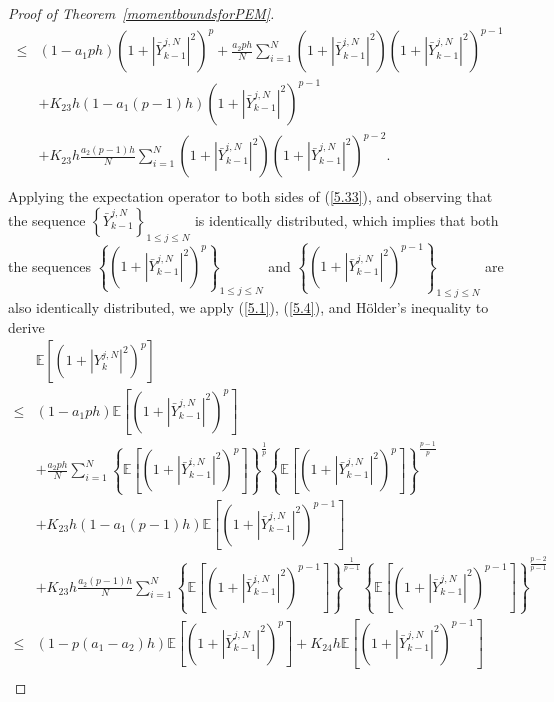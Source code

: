 \documentclass[12pt]{article}
\numberwithin{equation}{section}
\begin{document}
\begin{proof}[Proof of Theorem~\ref{momentboundsforPEM}]
\begin{equation}
\begin{aligned}
	\leq&\left( 1-a_1ph \right)  \left( 1+\left| \bar{Y}_{k-1}^{j,N} \right|^2 \right) ^p+\tfrac{a_2ph}{N}\sum_{i=1}^N{ \left( 1+\left| \bar{Y}_{k-1}^{i,N} \right|^2 \right) \left( 1+\left| \bar{Y}_{k-1}^{j,N} \right|^2 \right) ^{p-1}}\\
&+  K_{23}h\left(1-a_{1}\left(p-1\right)h\right) \left( 1+\left| \bar{Y}_{k-1}^{j,N} \right|^2 \right) ^{p-1}\\
&+K_{23}h\tfrac{a_2\left(p-1\right)h}{N}\sum_{i=1}^N{ \left( 1+\left| \bar{Y}_{k-1}^{i,N} \right|^2 \right) \left( 1+\left| \bar{Y}_{k-1}^{j,N} \right|^2 \right) ^{p-2}} .\\
\end{aligned}
\end{equation}
Applying the expectation operator to both sides of (\ref{5.33}), and observing that the sequence $\left\{ \bar{Y}_{k-1}^{j,N} \right\} _{1\leqslant j\leqslant N}$ is identically distributed, which implies that both the sequences $\left\{ \left( 1+\left| \bar{Y}_{k-1}^{j,N} \right|^2 \right)^p\right\} _{1\leqslant j\leqslant N}$ and $\left\{ \left( 1+\left| \bar{Y}_{k-1}^{j,N} \right|^2 \right)^{p-1}\right\} _{1\leqslant j\leqslant N}$ are also identically distributed, we apply (\ref{5.1}), (\ref{5.4}), and H\"{o}lder's inequality to  derive 
\begin{equation}\tag{5.81}\label{5.34}
\begin{aligned}
&\mathbb{E}\left[\left(1+\left|Y^{j,N}_k\right|^2\right)^p  \right]\\
\le& \left( 1-a_1ph \right) \mathbb{E} \left[ \left( 1+\left| \bar{Y}_{k-1}^{j,N} \right|^2 \right) ^p \right] 
\\
&+\tfrac{a_2ph}{N}\sum_{i=1}^N{\left\{ \mathbb{E} \left[ \left( 1+\left| \bar{Y}_{k-1}^{i,N} \right|^2 \right) ^p \right] \right\} ^{\frac{1}{p}}\left\{ \mathbb{E} \left[ \left( 1+\left| \bar{Y}_{k-1}^{j,N} \right|^2 \right) ^p \right] \right\} ^{\frac{p-1}{p}}}
\\
&+K_{23}h\left(1-a_{1}\left(p-1\right)h\right) \mathbb{E} \left[ \left( 1+\left| \bar{Y}_{k-1}^{j,N} \right|^2 \right) ^{p-1}\right]\\
&+K_{23}h\tfrac{a_2\left(p-1\right)h}{N}\sum_{i=1}^N{\left\{ \mathbb{E} \left[ \left( 1+\left| \bar{Y}_{k-1}^{i,N} \right|^2 \right) ^{p-1} \right] \right\} ^{\frac{1}{p-1}}\left\{ \mathbb{E} \left[ \left( 1+\left| \bar{Y}_{k-1}^{j,N} \right|^2 \right) ^{p-1} \right] \right\} ^{\frac{p-2}{p-1}}}\\
 \leq&\left(1-p\left(a_1-a_2\right) h\right)\mathbb{E}\left[\left(1+\left|\bar{Y}_{k-1}^{j,N}\right|^2\right)^p \right]+K_{24} h\mathbb{E}\left[\left(1+\left|\bar{Y}_{k-1}^{j,N}\right|^2\right)^{p-1}\right]\\

\end{aligned}
\end{equation}
\end{proof}
\end{document}
